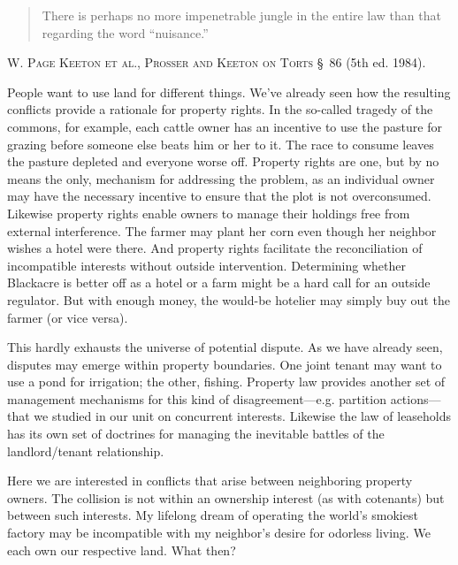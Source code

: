 \begin{quote}
There is perhaps no more impenetrable jungle in the entire law than that
regarding the word ``nuisance.''
\end{quote}
\textsc{W. Page Keeton et al.}, \textsc{Prosser and Keeton on Torts}
\S~86 (5th ed. 1984).


People want to use land for different things. We've already seen how the
resulting conflicts provide a rationale for property rights. In the so-called
tragedy of the commons, for example, each cattle owner has an incentive to use
the pasture for grazing before someone else beats him or her to it. The race to
consume leaves the pasture depleted and everyone worse off. Property rights are
one, but by no means the only, mechanism for addressing the problem, as an
individual owner may have the necessary incentive to ensure that the plot is not
overconsumed. Likewise property rights enable owners to manage their holdings
free from external interference. The farmer may plant her corn even though her
neighbor wishes a hotel were there. And property rights facilitate the
reconciliation of incompatible interests without outside intervention.
Determining whether Blackacre is better off as a hotel or a farm might be a hard
call for an outside regulator. But with enough money, the would-be hotelier may
simply buy out the farmer (or vice versa).



This hardly exhausts the universe of potential dispute. As we have already seen,
disputes may emerge within property boundaries. One joint tenant may want to use
a pond for irrigation; the other, fishing. Property law provides another set of
management mechanisms for this kind of disagreement---e.g. partition
actions---that we studied in our unit on concurrent interests. Likewise the law
of leaseholds has its own set of doctrines for managing the inevitable battles
of the landlord/tenant relationship.

Here we are interested in conflicts that arise between neighboring property
owners. The collision is not within an ownership interest (as with cotenants)
but between such interests. My lifelong dream of operating the world's smokiest
factory may be incompatible with my neighbor's desire for odorless living. We
each own our respective land. What then? 

